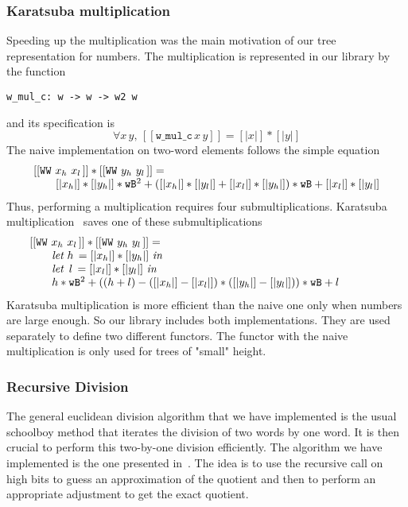 \subsubsection{Karatsuba multiplication}
Speeding up the multiplication was the main motivation of our 
tree representation for numbers. The multiplication is represented in our library
by the function
\begin{verbatim}
w_mul_c: w -> w -> w2 w
\end{verbatim}
and its specification is
$$\forall x\, y,\, [[\texttt{w\_mul\_c}\, x\, y]] = [|x|] * [|y|]$$
The naive implementation on two-word elements follows the simple equation
$$\begin{array}{l}
[[\texttt{WW}\,\,x_h\,\,x_l\,]] * [[\texttt{WW}\,\,y_h\,\,y_l\,]] =\\
\hskip20pt [|{x_h}|] * [|{y_h}|] * {\texttt{wB}} ^ 2 +  ([|{x_h}|] * [|{y_l}|] + [|{x_l}|] * [|{y_h}|]) * {\texttt{wB}} + [|{x_l}|] * [|{y_l}|]
\end{array}
$$
Thus, performing a multiplication requires four submultiplications.
Karatsuba multiplication~\cite{Karat} saves one of these submultiplications
$$\begin{array}{l}
[[\texttt{WW}\,\,x_h\,\,x_l\,]] * [[\texttt{WW}\,\,y_h\,\,y_l\,]] = \\
\hskip20pt \textit{let}\,\, {h}\, = [|{x_h}|] * [|{y_h}|]\,\, \textit{in}\\
\hskip20pt \textit{let}\,\,\,  {l}\, = [|{x_l}|] * [|{y_l}|]\,\, \textit{in}\\
\hskip20pt {h} * {\texttt{wB}}^2 + (({h} + {l}) - ([|{x_h}|] - [|{x_l}|]) * ([|{y_h}|] - [|{y_l}|])) * {\texttt{wB}} + {l} \qquad\qquad
\end{array}
$$
Karatsuba multiplication is more efficient than the naive one
only when numbers are large enough. So our library
includes both implementations. They are used separately to define two
different functors. The functor with the naive multiplication is only used 
for trees of "small" height. 

\subsubsection{Recursive Division}
The general euclidean division algorithm that we have implemented is the usual schoolboy 
method that iterates the division of two words by one word. 
It is then crucial to perform this two-by-one division efficiently. 
The algorithm we have implemented is the one presented in~\cite{RecDiv}.
The idea is to use the recursive call on high bits to guess an approximation 
of the quotient and  then to perform an appropriate adjustment to get the exact quotient.

